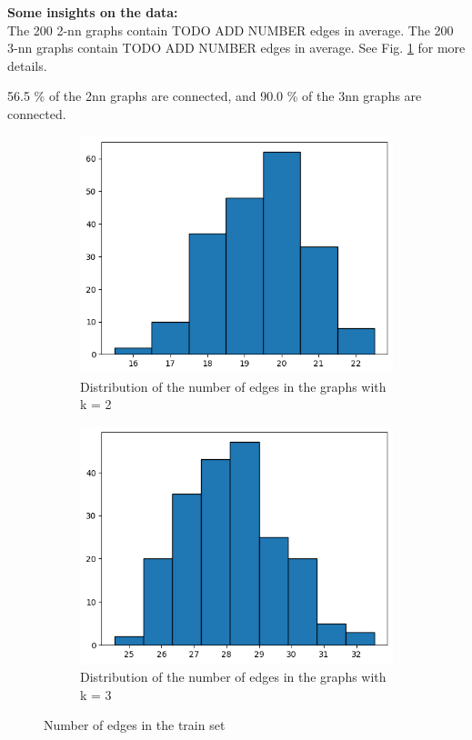 \documentclass[a4paper,11pt]{article}
\begin{document}
\textbf{Some insights on the data: }\\

The 200 2-nn graphs contain TODO ADD NUMBER edges in average. 
The 200 3-nn graphs contain TODO ADD NUMBER edges in average.
See Fig. \ref{fig:hist_edges} for more details. 

56.5 \% of the 2nn graphs are connected, and 90.0 \% of the 3nn graphs are connected.


\begin{figure}
    \centering
    \begin{subfigure}{0.4\textwidth}
        \includegraphics[width=\textwidth]{figures/hist_2_nn.png}
        \caption{Distribution of the number of edges in the graphs with k = 2}
    \end{subfigure}
    \begin{subfigure}{0.4\textwidth}
        \includegraphics[width=\textwidth]{figures/hist_3_nn.png}
        \caption{Distribution of the number of edges in the graphs with k = 3}
    \end{subfigure}
    \caption{Number of edges in the train set}
    \label{fig:hist_edges}
\end{figure}
\end{document}
